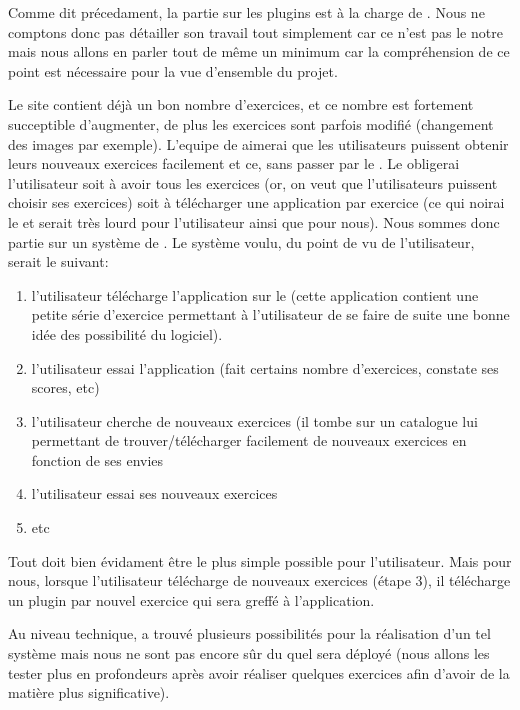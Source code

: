 Comme dit précedament, la partie sur les plugins est à la charge de \etudiantSL{}. Nous ne comptons donc pas détailler son travail tout simplement car ce n'est pas le notre mais nous allons en parler tout de même un minimum car la compréhension de ce point est nécessaire pour la vue d'ensemble du projet.

Le site \pepit{} contient déjà un bon nombre d'exercices, et ce nombre est fortement succeptible d'augmenter, de plus les exercices sont parfois modifié (changement des images par exemple). L'equipe de \pepit{} aimerai que les utilisateurs puissent obtenir leurs nouveaux exercices facilement et ce, sans passer par le \market{}. Le \market{} obligerai l'utilisateur soit à avoir tous les exercices (or, on veut que l'utilisateurs puissent choisir ses exercices) soit à télécharger une application par exercice (ce qui noirai le \market{} et serait très lourd pour l'utilisateur ainsi que pour nous).
\newline
Nous sommes donc partie sur un système de \plugins{}. Le système voulu, du point de vu de l'utilisateur, serait le suivant:
\begin{enumerate}
	\item l'utilisateur télécharge l'application sur le \market{} (cette application contient une petite série d'exercice permettant à l'utilisateur de se faire de suite une bonne idée des possibilité du logiciel).
	\item l'utilisateur essai l'application (fait certains nombre d'exercices, constate ses scores, etc)
	\item l'utilisateur cherche de nouveaux exercices (il tombe sur un catalogue lui permettant de trouver/télécharger facilement de nouveaux exercices en fonction de ses envies
	\item l'utilisateur essai ses nouveaux exercices
	\item etc
\end{enumerate}
Tout doit bien évidament être le plus simple possible pour l'utilisateur. Mais pour nous, lorsque l'utilisateur télécharge de nouveaux exercices (étape 3), il télécharge un plugin par nouvel exercice qui sera greffé à l'application. 

Au niveau technique, \etudiantSL{} a trouvé plusieurs possibilités pour la réalisation d'un tel système mais nous ne sont pas encore sûr du quel sera déployé (nous allons les tester plus en profondeurs après avoir réaliser quelques exercices afin d'avoir de la matière plus significative).

